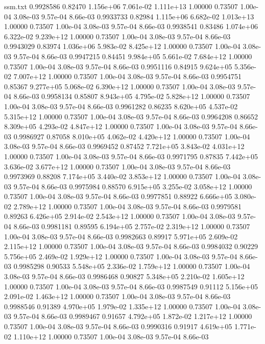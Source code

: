 \begin{filecontents}{ssm.txt}
0.9928586 0.82470 1.156e+06 7.061e-02 1.111e+13 1.00000 0.73507 1.00e-04 3.08e-03 9.57e-04 8.66e-03
0.9933733 0.82984 1.115e+06 6.682e-02 1.013e+13 1.00000 0.73507 1.00e-04 3.08e-03 9.57e-04 8.66e-03
0.9938541 0.83486 1.074e+06 6.322e-02 9.239e+12 1.00000 0.73507 1.00e-04 3.08e-03 9.57e-04 8.66e-03
0.9943029 0.83974 1.036e+06 5.983e-02 8.425e+12 1.00000 0.73507 1.00e-04 3.08e-03 9.57e-04 8.66e-03
0.9947215 0.84451 9.984e+05 5.661e-02 7.684e+12 1.00000 0.73507 1.00e-04 3.08e-03 9.57e-04 8.66e-03
0.9951116 0.84915 9.624e+05 5.356e-02 7.007e+12 1.00000 0.73507 1.00e-04 3.08e-03 9.57e-04 8.66e-03
0.9954751 0.85367 9.277e+05 5.068e-02 6.390e+12 1.00000 0.73507 1.00e-04 3.08e-03 9.57e-04 8.66e-03
0.9958134 0.85807 8.943e+05 4.795e-02 5.828e+12 1.00000 0.73507 1.00e-04 3.08e-03 9.57e-04 8.66e-03
0.9961282 0.86235 8.620e+05 4.537e-02 5.315e+12 1.00000 0.73507 1.00e-04 3.08e-03 9.57e-04 8.66e-03
0.9964208 0.86652 8.309e+05 4.293e-02 4.847e+12 1.00000 0.73507 1.00e-04 3.08e-03 9.57e-04 8.66e-03
0.9986927 0.87058 8.010e+05 4.062e-02 4.420e+12 1.00000 0.73507 1.00e-04 3.08e-03 9.57e-04 8.66e-03
0.9969452 0.87452 7.721e+05 3.843e-02 4.031e+12 1.00000 0.73507 1.00e-04 3.08e-03 9.57e-04 8.66e-03
0.9971795 0.87835 7.442e+05 3.636e-02 3.677e+12 1.00000 0.73507 1.00e-04 3.08e-03 9.57e-04 8.66e-03
0.9973969 0.88208 7.174e+05 3.440e-02 3.853e+12 1.00000 0.73507 1.00e-04 3.08e-03 9.57e-04 8.66e-03
0.9975984 0.88570 6.915e+05 3.255e-02 3.058e+12 1.00000 0.73507 1.00e-04 3.08e-03 9.57e-04 8.66e-03
0.9977851 0.88922 6.666e+05 3.080e-02 2.789e+12 1.00000 0.73507 1.00e-04 3.08e-03 9.57e-04 8.66e-03
0.9979581 0.89263 6.426e+05 2.914e-02 2.543e+12 1.00000 0.73507 1.00e-04 3.08e-03 9.57e-04 8.66e-03
0.9981181 0.89595 6.194e+05 2.757e-02 2.319e+12 1.00000 0.73507 1.00e-04 3.08e-03 9.57e-04 8.66e-03
0.9982663 0.89917 5.971e+05 2.609e-02 2.115e+12 1.00000 0.73507 1.00e-04 3.08e-03 9.57e-04 8.66e-03
0.9984032 0.90229 5.756e+05 2.469e-02 1.929e+12 1.00000 0.73507 1.00e-04 3.08e-03 9.57e-04 8.66e-03
0.9985298 0.90533 5.548e+05 2.336e-02 1.759e+12 1.00000 0.73507 1.00e-04 3.08e-03 9.57e-04 8.66e-03
0.9986468 0.90827 5.348e+05 2.210e-02 1.605e+12 1.00000 0.73507 1.00e-04 3.08e-03 9.57e-04 8.66e-03
0.9987549 0.91112 5.156e+05 2.091e-02 1.463e+12 1.00000 0.73507 1.00e-04 3.08e-03 9.57e-04 8.66e-03
0.9988546 0.91389 4.970e+05 1.979e-02 1.335e+12 1.00000 0.73507 1.00e-04 3.08e-03 9.57e-04 8.66e-03
0.9989467 0.91657 4.792e+05 1.872e-02 1.217e+12 1.00000 0.73507 1.00e-04 3.08e-03 9.57e-04 8.66e-03
0.9990316 0.91917 4.619e+05 1.771e-02 1.110e+12 1.00000 0.73507 1.00e-04 3.08e-03 9.57e-04 8.66e-03

\end{filecontents}
